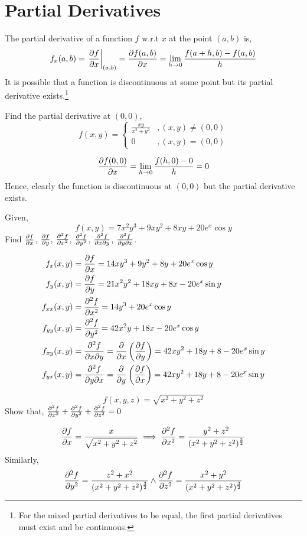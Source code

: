 \section{Partial Derivatives}
The partial derivative of a function $f$ w.r.t $x$ at the point $(a,b)$ is,
\[f_x(a,b)=\eval{\pdv{f}{x}}_{(a,b)}=\pdv{f(a,b)}{x}=\lim\limits_{h\to0}\frac{f(a+h,b)-f(a,b)}{h}\]
It is possible that a function is discontinuous at some point but its partial derivative exists.\footnote{For the mixed partial derivatives to be equal, the first partial derivatives must exist and be continuous.}\\
\begin{eg}
	Find the partial derivative at $(0,0)$,
	\[f(x,y)=\begin{cases}
		\frac{xy}{x^2+y^2} &, (x,y)\neq(0,0)\\
		0 &, (x,y)=(0,0)
	\end{cases}\]
\end{eg}
\begin{explanation}
	\[\pdv{f(0,0)}{x}=\lim\limits_{h\to0}\frac{f(h,0)-0}{h}=0\]
	Hence, clearly the function is discontinuous at $(0,0)$ but the partial derivative exists.
\end{explanation}

\begin{eg}
	Given,
	\[f(x,y)=7x^2y^3+9xy^2+8xy+20e^x\cos y\]
	Find $\pdv{f}{x}$, $\pdv{f}{y}$, $\pdv[2]{f}{x}$, $\pdv[2]{f}{y}$, $\pdv{f}{x}{y}$, $\pdv{f}{y}{x}$.
\end{eg}
\begin{explanation}
	\[\begin{split}
		f_x(x,y)&=\pdv{f}{x}=14xy^3+9y^2+8y+20e^x\cos y\\
		f_y(x,y)&=\pdv{f}{y}=21x^2y^2+18xy+8x-20e^x\sin y\\
		f_{xx}(x,y)&=\pdv[2]{f}{x}=14y^3+20e^x\cos y\\
		f_{yy}(x,y)&=\pdv[2]{f}{y}=42x^2y+18x-20e^x\cos y\\
		f_{xy}(x,y)&=\pdv{f}{x}{y}=\pdv{x}\left(\pdv{f}{y}\right)=42xy^2+18y+8-20e^x\sin y\\
		f_{yx}(x,y)&=\pdv{f}{y}{x}=\pdv{y}\left(\pdv{f}{x}\right)=42xy^2+18y+8-20e^x\sin y\\
	\end{split}\]
\end{explanation}
\begin{eg}
	\[f(x,y,z)=\sqrt{x^2+y^2+z^2}\]
	Show that, $\pdv[2]{f}{x}+\pdv[2]{f}{y}+\pdv[2]{f}{z}=0$
\end{eg}
\begin{explanation}
	\[\pdv{f}{x}=\frac{x}{\sqrt{x^2+y^2+z^2}}\implies \pdv[2]{f}{x}=\frac{y^2+z^2}{(x^2+y^2+z^2)^\frac{3}{2}}\]
	Similarly,
	\[\pdv[2]{f}{y}=\frac{z^2+x^2}{(x^2+y^2+z^2)^\frac{3}{2}} \land \pdv[2]{f}{z}=\frac{x^2+y^2}{(x^2+y^2+z^2)^\frac{3}{2}}\]
\end{explanation}
